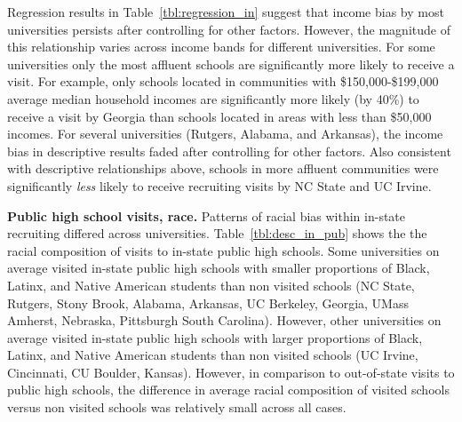 \documentclass[twoside]{article}
\begin{document}
Regression results in Table~\ref{tbl:regression_in} suggest that income bias by most universities persists after controlling for other factors. However, the magnitude of this relationship varies across income bands for different universities. For some universities only the most affluent schools are significantly more likely to receive a visit. For example, only schools located in communities with \$150,000-\$199,000 average median household incomes are significantly more likely (by 40\%) to receive a visit by Georgia than schools located in areas with less than \$50,000 incomes. For several universities (Rutgers, Alabama, and Arkansas), the income bias in descriptive results faded after controlling for other factors. Also consistent with descriptive relationships above, schools in more affluent communities were significantly \textit{less} likely to receive recruiting visits by NC State and UC Irvine.

\textbf{Public high school visits, race.} Patterns of racial bias within in-state recruiting differed across universities. Table~\ref{tbl:desc_in_pub} shows the the racial composition of visits to in-state public high schools. Some universities on average visited in-state public high schools with smaller proportions of Black, Latinx, and Native American students than non visited schools (NC State, Rutgers, Stony Brook, Alabama, Arkansas, UC Berkeley, Georgia, UMass Amherst, Nebraska, Pittsburgh South Carolina). However, other universities on average visited in-state public high schools with larger proportions of Black,  Latinx, and Native American students than non visited schools (UC Irvine, Cincinnati, CU Boulder, Kansas). However, in comparison to out-of-state visits to public high schools, the difference in average racial composition of visited schools versus non visited schools was relatively small across all cases.


\end{document}
